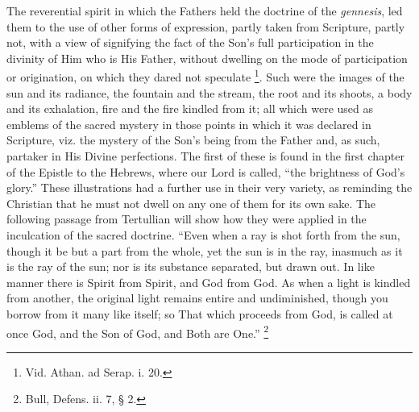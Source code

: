 The reverential spirit in which the Fathers held the doctrine of
the \emph{gennesis}, led them to the use of other forms of expression,
partly taken from Scripture, partly not, with a view of signifying the
fact of the Son's full participation in the divinity of Him who is His
Father, without dwelling on the mode of participation or origination,
on which they dared not speculate \footnote{Vid. Athan. ad Serap. i. 20.}. Such were the images of the sun and its radiance, the
fountain and the stream, the root and its shoots, a body and its
exhalation, fire and the fire kindled from it; all which were used as
emblems of the sacred mystery in those points in which it was declared
in Scripture, viz. the mystery of the Son's being from the Father and,
as such, partaker in His Divine perfections. The first of these is
found in the first chapter of the Epistle to the Hebrews, where our
Lord is called, ``the brightness of God's glory.'' These
illustrations had a further use in their very variety, as reminding
the Christian that he must not dwell on any one of them for its own
sake. The following passage from Tertullian will show how they were
applied in the inculcation of the sacred doctrine. ``Even when a
ray is shot forth from the sun, though it be but a part from the
whole, yet the sun is in the ray, inasmuch as it is the ray of the
sun; nor is its substance separated, but drawn out. In like manner
there is Spirit from Spirit, and God from God. As when a light is
kindled from another, the original light remains entire and
undiminished, though you borrow from it many like itself; so That
which proceeds from God, is called at once God, and the Son of God,
and Both are One.'' \footnote{Bull, Defens. ii. 7, § 2.}

